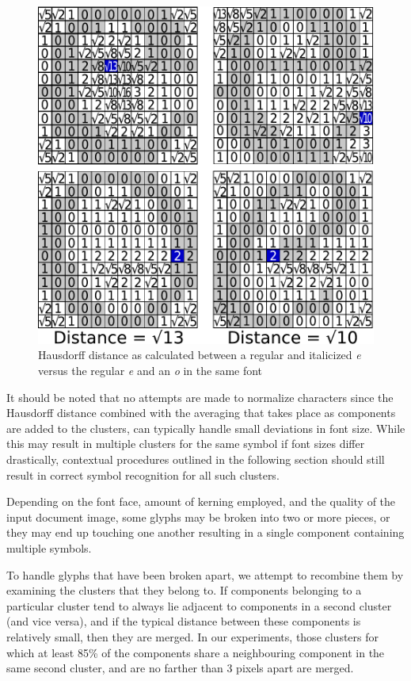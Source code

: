 \documentclass[times, 10pt,twocolumn]{article}
\begin{document}
\begin{figure}[ht]
  \centering
  \includegraphics[scale=.5]{figures/haus_dist_comparisons}
  \caption{Hausdorff distance as calculated between a regular and italicized
  {\em e} versus the regular {\em e} and an {\em o} in the same font}
  \label{hausdist_fig}
\end{figure}

It should be noted that no attempts are made to normalize characters since the
Hausdorff distance combined with the averaging that takes place as components
are added to the clusters, can typically handle small deviations in font size.
While this may result in multiple clusters for the same symbol if font sizes
differ drastically, contextual procedures outlined in the following section
should still result in correct symbol recognition for all such clusters.

Depending on the font face, amount of kerning employed, and the quality of the
input document image, some glyphs may be broken into two or more pieces, or
they may end up touching one another resulting in a single component containing
multiple symbols.

To handle glyphs that have been broken apart, we attempt to recombine them by
examining the clusters that they belong to.  If components belonging to a
particular cluster tend to always lie adjacent to components in a second
cluster (and vice versa), and if the typical distance between these components
is relatively small, then they are merged.  In our experiments, those clusters
for which at least 85\% of the components share a neighbouring component in the
same second cluster, and are no farther than 3 pixels apart are merged.
\end{document}
